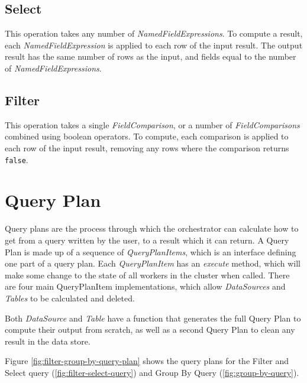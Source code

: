 \subsection{Select} 
This operation takes any number of \textit{NamedFieldExpressions}. To compute a result, each \textit{NamedFieldExpression} is applied to each row of the input result. The output result has the same number of rows as the input, and fields equal to the number of \textit{NamedFieldExpressions}. 

\subsection{Filter}
This operation takes a single \textit{FieldComparison}, or a number of \textit{FieldComparisons} combined using boolean operators. To compute, each comparison is applied to each row of the input result, removing any rows where the comparison returns \texttt{false}.



\section{Query Plan}
Query plans are the process through which the orchestrator can calculate how to get from a query written by the user, to a result which it can return. A Query Plan is made up of a sequence of \textit{QueryPlanItems}, which is an interface defining one part of a query plan. Each \textit{QueryPlanItem} has an \textit{execute} method, which will make some change to the state of all workers in the cluster when called. There are four main QueryPlanItem implementations, which allow \textit{DataSources} and \textit{Tables} to be calculated and deleted.

Both \textit{DataSource} and \textit{Table} have a function that generates the full Query Plan to compute their output from scratch, as well as a second Query Plan to clean any result in the data store. 

Figure \ref{fig:filter-group-by-query-plan} shows the query plans for the Filter and Select query (\ref{fig:filter-select-query}) and Group By Query (\ref{fig:group-by-query}).

